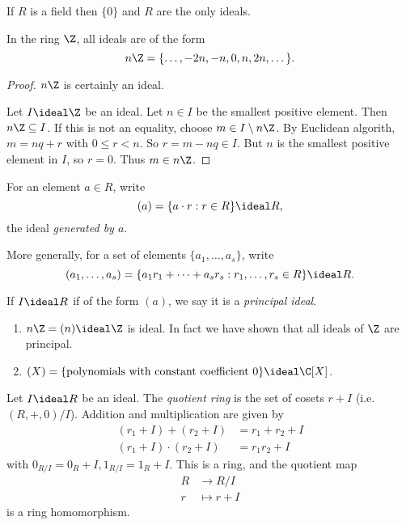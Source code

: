\documentclass[a4paper]{article}
\theoremstyle{definition}
\begin{document}
\begin{eg}
  If \(R\) is a field then \(\{0\}\) and \(R\) are the only ideals.
\end{eg}

\begin{eg}
  In the ring \(\Z\), all ideals are of the form
  \[
    n\Z = \{\dots, -2n, -n, 0, n, 2n, \dots\}.
  \]
\end{eg}

\begin{proof}
  \(n\Z\) is certainly an ideal.

  Let \(I \ideal \Z\) be an ideal. Let \(n \in I\) be the smallest positive element. Then \(n\Z \subseteq I\). If this is not an equality, choose \(m \in I \setminus n\Z\). By Euclidean algorith, \(m = nq + r\) with \(0 \leq r < n\). So \(r = m - nq \in I\). But \(n\) is the smallest positive element in \(I\), so \(r = 0\). Thus \(m \in n\Z\).
\end{proof}

\begin{definition}
  For an element \(a \in R\), write
  \[
    (a) = \{a \cdot r: r \in R\} \ideal R,
  \]
  the ideal \emph{generated by \(a\)}.

  More generally, for a set of elements \(\{a_1, \dots, a_s\}\), write
  \[
    (a_1, \dots, a_s) = \{a_1r_1 + \dots + a_sr_s: r_1, \dots, r_s \in R\} \ideal R.
  \]
\end{definition}

\begin{definition}
  If \(I \ideal R\) if of the form \((a)\), we say it is a \emph{principal ideal}.
\end{definition}

\begin{eg}\leavevmode
  \begin{enumerate}
  \item \(n\Z = (n) \ideal \Z\) is ideal. In fact we have shown that all ideals of \(\Z\) are principal.
  \item \((X) = \{\text{polynomials with constant coefficient } 0\} \ideal \C[X]\).
  \end{enumerate}
\end{eg}

\begin{proposition}
  Let \(I \ideal R\) be an ideal. The \emph{quotient ring} is the set of cosets \(r + I\) (i.e.\ \((R, +, 0)/I\)). Addition and multiplication are given by
  \begin{align*}
    (r_1 + I) + (r_2 + I) &= r_1 + r_2 + I \\
    (r_1 + I) \cdot (r_2 + I) &= r_1r_2 + I
  \end{align*}
  with \(0_{R/I} = 0_R + I, 1_{R/I} = 1_R + I\). This is a ring, and the quotient map
  \begin{align*}
    R &\to R/I \\
    r &\mapsto r + I
  \end{align*}
  is a ring homomorphism.
\end{proposition}
\end{document}
